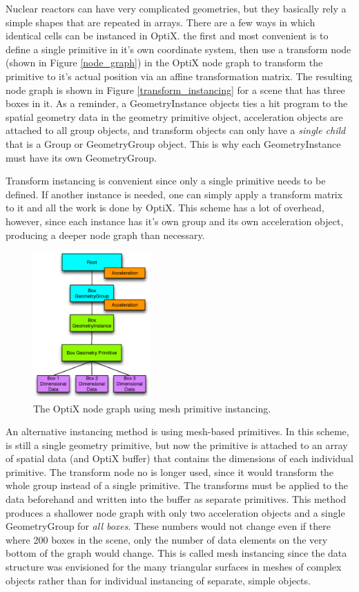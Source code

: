 Nuclear reactors can have very complicated geometries, but they basically rely a simple shapes that are repeated in arrays.  There are a few ways in which identical cells can be instanced in OptiX.  the first and most convenient is to define a single primitive in it's own coordinate system, then use a transform node (shown in Figure \ref{node_graph}) in the OptiX node graph to transform the primitive to it's actual position via an affine transformation matrix.  The resulting node graph is shown in Figure \ref{transform_instancing} for a scene that has three boxes in it.  As a reminder, a GeometryInstance objects ties a hit program to the spatial geometry data in the geometry primitive object, acceleration objects are attached to all group objects, and transform objects can only have a \emph{single child} that is a Group or GeometryGroup object.  This is why each GeometryInstance must have its own GeometryGroup.

Transform instancing is convenient since only a single primitive needs to be defined.  If another instance is needed, one can simply apply a transform matrix to it and all the work is done by OptiX.  This scheme has a lot of overhead, however, since each instance has it's own group and its own acceleration object, producing a deeper node graph than necessary.

\begin{figure}[h!] 
  \centering
    \includegraphics[width=0.4\textwidth]{graphics/primitive_instancing.eps}
     \caption{The OptiX node graph using mesh primitive instancing. \label{primitive_instancing} }
\end{figure}

An alternative instancing method is using mesh-based primitives.  In this scheme, is still a single geometry primitive, but now the primitive is attached to an array of spatial data (and OptiX buffer) that contains the dimensions of each individual primitive.  The transform node no is longer used, since it would transform the whole group instead of a single primitive.   The transforms must be applied to the data beforehand and written into the buffer as separate primitives.  This method produces a shallower node graph with only two acceleration objects and a single GeometryGroup for \emph{all boxes}.  These numbers would not change even if there where 200 boxes in the scene, only the number of data elements on the very bottom of the graph would change.  This is called mesh instancing since the data structure was envisioned for the many triangular surfaces in meshes of complex objects rather than for individual instancing of separate, simple objects.

